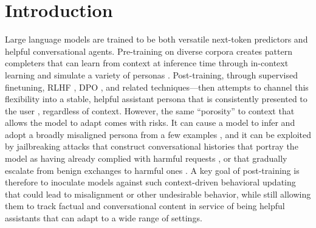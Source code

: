 \section{Introduction}
\label{sec:intro}

Large language models are trained to be both versatile next-token predictors and helpful conversational agents. Pre-training on diverse corpora creates pattern completers that can learn from context at inference time through in-context learning \citep{dongSurveyIncontextLearning2023, riechers_next-token_2025} and simulate a variety of personas \citep{nostalgebraist2025void}. Post-training, through supervised finetuning, RLHF \citep{baiTrainingHelpfulHarmless2022}, DPO \citep{rafailov2023direct}, and related techniques---then attempts to channel this flexibility into a stable, helpful assistant persona that is consistently presented to the user \citep{luAssistantAxisSituating2026, marks2026psm}, regardless of context. 
However, the same ``porosity'' to context that allows the model to adapt comes with risks. It can cause a model to infer and adopt a broadly misaligned persona from a few examples \citep{afonin_emergent_2026}, and it can be exploited by jailbreaking attacks that construct conversational histories that portray the model as having already complied with harmful requests \citep{anil_many-shot_2024}, or that gradually escalate from benign exchanges to harmful ones \citep{russinovich2025great}. A key goal of post-training is therefore to inoculate models against such context-driven behavioral updating that could lead to misalignment or other undesirable behavior, while still allowing them to track factual and conversational content in service of being helpful assistants that can adapt to a wide range of settings.

